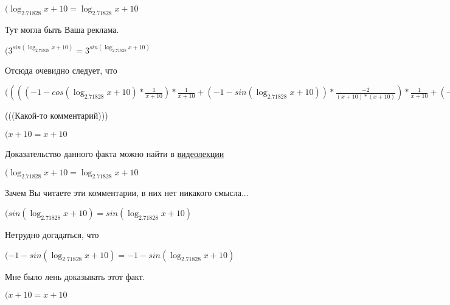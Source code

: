 \documentclass[12pt,a4paper,fleqn]{article}
\theoremstyle{definition}
\begin{document}
$(\log_{ 2.71828 }{ x  +  10 } = \log_{ 2.71828 }{ x  +  10 }$

Тут могла быть Ваша реклама.

$({ 3 }^{sin(\log_{ 2.71828 }{ x  +  10 })} = { 3 }^{sin(\log_{ 2.71828 }{ x  +  10 })}$

Отсюда очевидно следует, что

$(((( -1  - cos(\log_{ 2.71828 }{ x  +  10 }) * \frac{ 1 }{ x  +  10 }
) * \frac{ 1 }{ x  +  10 }
 + ( -1  - sin(\log_{ 2.71828 }{ x  +  10 })) * \frac{ -2 }{( x  +  10 ) * ( x  +  10 )}
) * \frac{ 1 }{ x  +  10 }
 + ( -1  - sin(\log_{ 2.71828 }{ x  +  10 })) * \frac{ 1 }{ x  +  10 }
 * \frac{ -2 }{( x  +  10 ) * ( x  +  10 )}
 + ( -1  - sin(\log_{ 2.71828 }{ x  +  10 })) * \frac{ 1 }{ x  +  10 }
 * \frac{ -2 }{( x  +  10 ) * ( x  +  10 )}
 + cos(\log_{ 2.71828 }{ x  +  10 }) * \frac{ -1  -  -2  * ( x  +  10  +  x  +  10 )}{( x  +  10 ) * ( x  +  10 ) * ( x  +  10 ) * ( x  +  10 )}
) * { 3 }^{sin(\log_{ 2.71828 }{ x  +  10 })} = ((( -1  - cos(\log_{ 2.71828 }{ x  +  10 }) * \frac{ 1 }{ x  +  10 }
) * \frac{ 1 }{ x  +  10 }
 + ( -1  - sin(\log_{ 2.71828 }{ x  +  10 })) * \frac{ -2 }{( x  +  10 ) * ( x  +  10 )}
) * \frac{ 1 }{ x  +  10 }
 + ( -1  - sin(\log_{ 2.71828 }{ x  +  10 })) * \frac{ 1 }{ x  +  10 }
 * \frac{ -2 }{( x  +  10 ) * ( x  +  10 )}
 + ( -1  - sin(\log_{ 2.71828 }{ x  +  10 })) * \frac{ 1 }{ x  +  10 }
 * \frac{ -2 }{( x  +  10 ) * ( x  +  10 )}
 + cos(\log_{ 2.71828 }{ x  +  10 }) * \frac{ -1  -  -2  * ( x  +  10  +  x  +  10 )}{( x  +  10 ) * ( x  +  10 ) * ( x  +  10 ) * ( x  +  10 )}
) * { 3 }^{sin(\log_{ 2.71828 }{ x  +  10 })}$

(((Какой-то комментарий)))

$( x  +  10  =  x  +  10 $

Доказательство данного факта можно найти в \href{https://www.youtube.com/watch?v=dQw4w9WgXcQ}{видеолекции}

$(\log_{ 2.71828 }{ x  +  10 } = \log_{ 2.71828 }{ x  +  10 }$

Зачем Вы читаете эти комментарии, в них нет никакого смысла...

$(sin(\log_{ 2.71828 }{ x  +  10 }) = sin(\log_{ 2.71828 }{ x  +  10 })$

Нетрудно догадаться, что

$( -1  - sin(\log_{ 2.71828 }{ x  +  10 }) =  -1  - sin(\log_{ 2.71828 }{ x  +  10 })$

Мне было лень доказывать этот факт.

$( x  +  10  =  x  +  10 $
\end{document}
